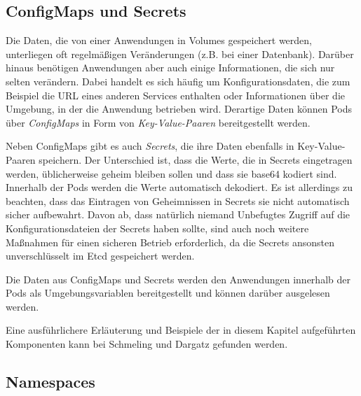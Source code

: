 \documentclass[11pt,a4paper]{article}
\begin{document}
\subsection{ConfigMaps und Secrets}
Die Daten, die von einer Anwendungen in Volumes gespeichert werden, unterliegen oft regelmäßigen Veränderungen
(z.B. bei einer Datenbank). Darüber hinaus benötigen Anwendungen aber auch einige Informationen, die sich nur 
selten verändern. Dabei handelt es sich häufig um Konfigurationsdaten, die zum Beispiel die URL eines anderen
Services enthalten oder Informationen über die Umgebung, in der die Anwendung betrieben wird.
Derartige Daten können Pods über \emph{ConfigMaps} in Form von \emph{Key-Value-Paaren} bereitgestellt werden.

Neben ConfigMaps gibt es auch \emph{Secrets}, die ihre Daten ebenfalls in Key-Value-Paaren speichern.
Der Unterschied ist, dass die Werte, die in Secrets eingetragen werden, üblicherweise geheim bleiben sollen und
dass sie base64 kodiert sind. Innerhalb der Pods werden die Werte automatisch dekodiert.
Es ist allerdings zu beachten, dass das Eintragen von Geheimnissen in Secrets sie nicht automatisch sicher
aufbewahrt. Davon ab, dass natürlich niemand Unbefugtes Zugriff auf die Konfigurationsdateien der Secrets haben sollte,
sind auch noch weitere Maßnahmen für einen sicheren Betrieb erforderlich, da die Secrets ansonsten
unverschlüsselt im Etcd gespeichert werden.

Die Daten aus ConfigMaps und Secrets werden den Anwendungen innerhalb der Pods als Umgebungsvariablen
bereitgestellt und können darüber ausgelesen werden.

Eine ausführlichere Erläuterung und Beispiele der in diesem Kapitel aufgeführten Komponenten 
kann bei Schmeling und Dargatz \cite{Schmeling_Dargatz_2022} gefunden werden.

\subsection{Namespaces}

\end{document}
